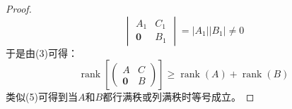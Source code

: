 \begin{proof}
	\begin{equation*}
		\begin{vmatrix}
			A_1 & C_1 \\
			\mathbf{0} & B_1
		\end{vmatrix}=|A_1||B_1|\ne0
	\end{equation*}
	于是由(3)可得：
	\begin{equation*}
		\operatorname{rank}\left[
		\begin{pmatrix}
			A & C \\
			\mathbf{0} & B
		\end{pmatrix}
		\right]\geqslant\operatorname{rank}(A)+\operatorname{rank}(B)
	\end{equation*}
	类似(5)可得到当$A$和$B$都行满秩或列满秩时等号成立。\par
\end{proof}

